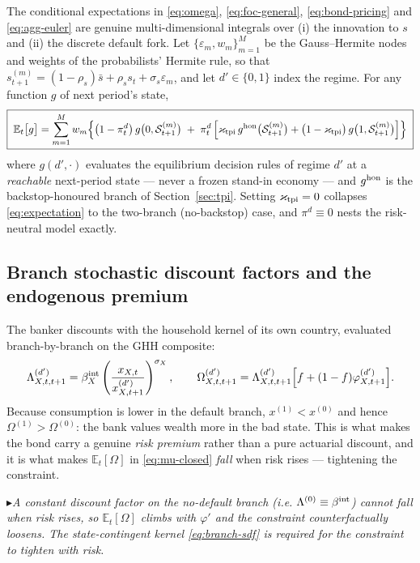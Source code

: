 \documentclass[11pt]{article}
\numberwithin{equation}{section}
\newcommand{\E}{\mathbb{E}}
\theoremstyle{definition}
\theoremstyle{plain}
\theoremstyle{remark}
\newcommand{\impl}[1]{\par\smallskip\noindent\textcolor{notec}{$\blacktriangleright$}\;\emph{#1}\par\smallskip}
\begin{document}
The conditional expectations in \eqref{eq:omega}, \eqref{eq:foc-general},
\eqref{eq:bond-pricing} and \eqref{eq:agg-euler} are genuine multi-dimensional
integrals over (i) the innovation to $s$ and (ii) the discrete default fork. Let
$\{\varepsilon_m,w_m\}_{m=1}^{M}$ be the Gauss--Hermite nodes and weights of the
probabilists' Hermite rule, so that
$s_{t+1}^{(m)}=(1-\rho_s)\bar s+\rho_s s_t+\sigma_s\varepsilon_m$, and let
$d'\in\{0,1\}$ index the regime. For any function $g$ of next period's state,
\begin{equation}
\boxed{\;
\E_t\bigl[g\bigr]
=\sum_{m=1}^{M}w_m\Bigl\{
   \bigl(1-\pi^{d}_t\bigr)\,g\bigl(0,\mathcal{S}^{(m)}_{t+1}\bigr)
   \;+\;\pi^{d}_t\,\Bigl[
      \varkappa_{\rm tpi}\,g^{\rm hon}\bigl(\mathcal{S}^{(m)}_{t+1}\bigr)
      +\bigl(1-\varkappa_{\rm tpi}\bigr)\,g\bigl(1,\mathcal{S}^{(m)}_{t+1}\bigr)
   \Bigr]\Bigr\}\;}
\label{eq:expectation}
\end{equation}
where $g(d',\cdot)$ evaluates the equilibrium decision rules of regime $d'$ at a
\emph{reachable} next-period state --- never a frozen stand-in economy --- and
$g^{\rm hon}$ is the backstop-honoured branch of Section~\ref{sec:tpi}. Setting
$\varkappa_{\rm tpi}=0$ collapses \eqref{eq:expectation} to the two-branch
(no-backstop) case, and $\pi^{d}\equiv0$ nests the risk-neutral model exactly.

\subsection{Branch stochastic discount factors and the endogenous premium}

The banker discounts with the household kernel of its own country, evaluated
branch-by-branch on the GHH composite:
\begin{equation}
\Lambda^{(d')}_{X,t,t+1}
=\beta^{\rm int}_X
 \left(\frac{x_{X,t}}{x^{(d')}_{X,t+1}}\right)^{\sigma_X},
\qquad
\Omega^{(d')}_{X,t,t+1}
=\Lambda^{(d')}_{X,t,t+1}\Bigl[f+(1-f)\varphi^{(d')}_{X,t+1}\Bigr].
\label{eq:branch-sdf}
\end{equation}
Because consumption is lower in the default branch, $x^{(1)}<x^{(0)}$ and hence
$\Omega^{(1)}>\Omega^{(0)}$: the bank values wealth more in the bad state. This is
what makes the bond carry a genuine \emph{risk premium} rather than a pure
actuarial discount, and it is what makes $\E_t[\Omega]$ in \eqref{eq:mu-closed}
\emph{fall} when risk rises --- tightening the constraint.

\impl{A constant discount factor on the no-default branch (i.e.
$\Lambda^{(0)}\equiv\beta^{\rm int}$) cannot fall when risk rises, so
$\E_t[\Omega]$ climbs with $\varphi'$ and the constraint counterfactually
\emph{loosens}. The state-contingent kernel \eqref{eq:branch-sdf} is required for
the constraint to tighten with risk.}
\end{document}
